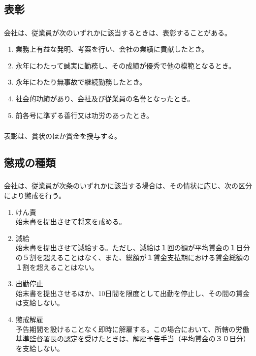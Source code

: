 \documentclass{jsarticle}
\begin{document}
\subsection{表彰}
\label{就規_条_表彰}
\subsubsection{}
\label{就規_項_表彰}
会社は、従業員が次のいずれかに該当するときは、表彰することがある。
  \begin{enumerate}
    \item 業務上有益な発明、考案を行い、会社の業績に貢献したとき。
    \item 永年にわたって誠実に勤務し、その成績が優秀で他の模範となるとき。
    \item 永年にわたり無事故で継続勤務したとき。
    \item 社会的功績があり、会社及び従業員の名誉となったとき。
    \item 前各号に準ずる善行又は功労のあったとき。
  \end{enumerate}
\subsubsection{}
\label{就規_項_賞品}
表彰は、賞状のほか賞金を授与する。

\subsection{懲戒の種類}
\label{就規_条_懲戒の種類}
\subsubsection{}
\label{就規_項_懲戒の種類}
会社は、従業員が次条のいずれかに該当する場合は、その情状に応じ、次の区分により懲戒を行う。
  \begin{enumerate}
    \item けん責 \\
          始末書を提出させて将来を戒める。
    \item 減給 \\
          始末書を提出させて減給する。ただし、減給は１回の額が平均賃金の１日分の５割を超えることはなく、また、総額が１賃金支払期における賃金総額の１割を超えることはない。
    \item 出勤停止 \\
          始末書を提出させるほか、10日間を限度として出勤を停止し、その間の賃金は支給しない。
    \item 懲戒解雇 \\
          予告期間を設けることなく即時に解雇する。この場合において、所轄の労働基準監督署長の認定を受けたときは、解雇予告手当（平均賃金の３０日分）を支給しない。
  \end{enumerate}
\end{document}
